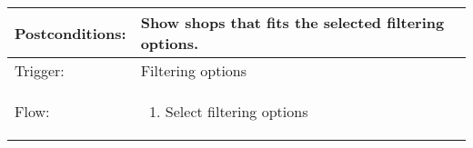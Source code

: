 \begin{longtable}{| p{3.5cm} | p{9cm} |}
\hline
Postconditions: & Show shops that fits the selected filtering options. \\
\hline
Trigger: & Filtering options\\
\hline
Flow: &\mbox{}\par\vspace{-\baselineskip}
\begin{enumerate}
\item Select filtering options
\end{enumerate}\\
\hline
\end{longtable}





